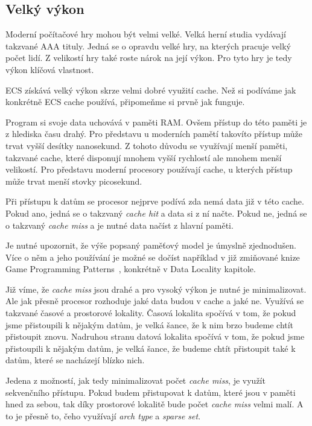 
\subsection{Velký výkon}
\label{sec:ecs_props}

Moderní počítačové hry mohou být velmi velké. Velká herní studia vydávají takzvané AAA tituly. Jedná se o opravdu velké hry, na kterých pracuje velký počet lidí. Z velikostí hry také roste nárok na její výkon. Pro tyto hry je tedy výkon klíčová vlastnost.

ECS získává velký výkon skrze velmi dobré využití cache. Než si podíváme jak konkrétně ECS cache používá, připomeňme si prvně jak funguje.

Program si svoje data uchovává v paměti RAM. Ovšem přístup do této paměti je z hlediska času drahý. Pro představu u moderních pamětí takovíto přístup může trvat vyšší desítky nanosekund. Z tohoto důvodu se využívají menší paměti, takzvané cache, které disponují mnohem vyšší rychlostí ale mnohem menší velikostí. Pro představu moderní procesory používají cache, u kterých přístup může trvat menší stovky picosekund.

Při přístupu k datům se procesor nejprve podívá zda nemá data již v této cache. Pokud ano, jedná se o takzvaný \textit{cache hit} a data si z ní načte. Pokud ne, jedná se o takzvaný \textit{cache miss} a je nutné data načíst z hlavní paměti. 

Je nutné upozornit, že výše popsaný paměťový model je úmyslně zjednodušen. Více o něm a jeho používání je možné se dočíst například v již zmiňované knize Game Programming Patterns~\cite{nystrom2014game}, konkrétně v Data Locality kapitole.

Již víme, že \textit{cache miss} jsou drahé a pro vysoký výkon je nutné je minimalizovat. Ale jak přesně procesor rozhoduje jaké data budou v cache a jaké ne. Využívá se takzvané časové a prostorové lokality. Časová lokalita spočívá v tom, že pokud jsme přistoupili k nějakým datům, je velká šance, že k nim brzo budeme chtít přistoupit znovu. Nadruhou stranu datová lokalita spočívá v tom, že pokud jsme přistoupili k nějakým datům, je velká šance, že budeme chtít přistoupit také k datům, které se nacházejí blízko nich.

Jedena z možností, jak tedy minimalizovat počet \textit{cache miss}, je využít sekvenčního přístupu. Pokud budem přistupovat k datům, které jsou v paměti hned za sebou, tak díky prostorové lokalitě bude počet \textit{cache miss} velmi malí. A to je přesně to, čeho využívají \textit{arch type} a \textit{sparse set}.





